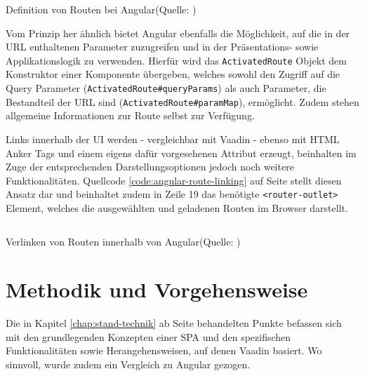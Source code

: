 \documentclass[a4paper,12pt,twoside]{scrreprt}
\begin{document}
\begin{listing}[ht]
    \inputminted[fontsize=\footnotesize,linenos]{js}{code/Angular_Routes-definition.js}
    \caption[Definition von Routen bei Angular]{Definition von Routen bei Angular\newline(Quelle: \cite[][]{google_llc_angular_nodate})}
    \label{code:angular-route-definition}
\end{listing}

Vom Prinzip her ähnlich bietet Angular ebenfalls die Möglichkeit, auf die in der URL enthaltenen Parameter zuzugreifen und in der Präsentations- sowie Applikationslogik zu verwenden. Hierfür wird das \texttt{ActivatedRoute} Objekt dem Konstruktor einer Komponente übergeben, welches sowohl den Zugriff auf die Query Parameter (\texttt{ActivatedRoute\#queryParams}) als auch Parameter, die Bestandteil der URL sind (\texttt{ActivatedRoute\#paramMap}), ermöglicht. Zudem stehen allgemeine Informationen zur Route selbst zur Verfügung. \parencite[][]{google_llc_angular_nodate}

\medskip

Links innerhalb der \acs{UI} werden - vergleichbar mit Vaadin - ebenso mit HTML Anker Tags und einem eigens dafür vorgesehenen Attribut erzeugt, beinhalten im Zuge der entsprechenden Darstellungsoptionen jedoch noch weitere Funktionalitäten. Quellcode \ref{code:angular-route-linking} auf Seite \pageref{code:angular-route-linking} stellt diesen Ansatz dar und beinhaltet zudem in Zeile 19 das benötigte \texttt{<router-outlet>} Element, welches die ausgewählten und geladenen Routen im Browser darstellt. \parencite[][]{google_llc_angular_nodate}

\begin{listing}[ht]
    \inputminted[fontsize=\footnotesize,linenos]{html}{code/Angular_Routing-tags.html}
    \caption[Verlinken von Routen innerhalb von Angular]{Verlinken von Routen innerhalb von Angular\newline(Quelle: \cite[][]{google_llc_angular_nodate})}
    \label{code:angular-route-linking}
\end{listing}

\chapter{Methodik und Vorgehensweise}
\label{chap:methodik-vorgehensweise}
Die in Kapitel \ref{chap:stand-technik} ab Seite \pageref{chap:stand-technik} behandelten Punkte befassen sich mit den grundlegenden Konzepten einer \ac{SPA} und den spezifischen Funktionalitäten sowie Herangehensweisen, auf denen Vaadin basiert. Wo sinnvoll, wurde zudem ein Vergleich zu Angular gezogen.
\end{document}
